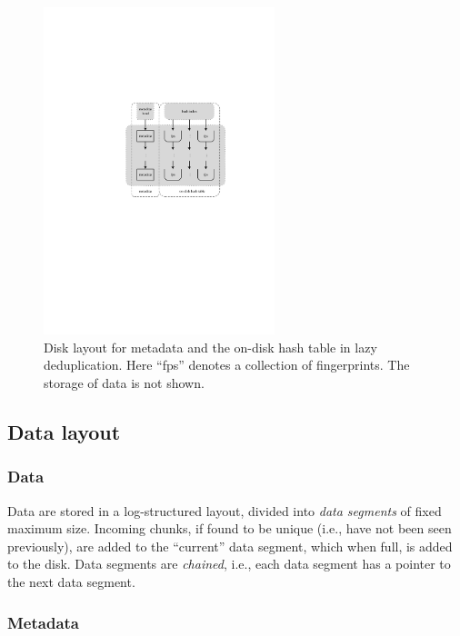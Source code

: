 \documentclass[prodmode,acmtecs]{acmsmall}
\begin{document}
\begin{figure}[htbp]
  \begin{center}
  \includegraphics[width=0.6\textwidth]{data-layout}
  \end{center}
  \caption{Disk layout for metadata and the on-disk hash table in lazy deduplication.  Here ``fps'' denotes a collection of fingerprints.  The storage of data is not shown.}
  \label{fig:data-layout}
\end{figure}


\subsection{Data layout}

\subsubsection{Data}

Data are stored in a log-structured layout, divided into \emph{data segments} of fixed maximum size.  Incoming chunks, if found to be unique (i.e., have not been seen previously), are added to the ``current'' data segment, which when full, is added to the disk.  Data segments are \emph{chained}, i.e., each data segment has a pointer to the next data segment.

\subsubsection{Metadata}
\end{document}

